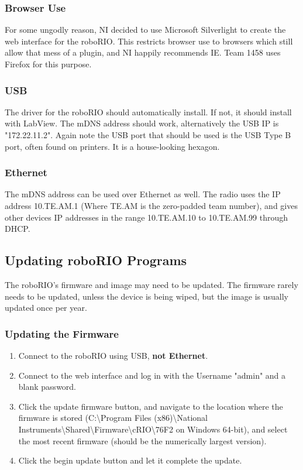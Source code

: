 \documentclass[]{report}
\begin{document}
\subsubsection{Browser Use}
For some ungodly reason, NI decided to use Microsoft Silverlight to create the web interface for the roboRIO.
This restricts browser use to browsers which still allow that mess of a plugin, and NI happily recommends IE.
Team 1458 uses Firefox for this purpose.

\subsubsection{USB}
The driver for the roboRIO should automatically install. If not, it should install with LabView.
The mDNS address should work, alternatively the USB IP is "172.22.11.2".
Again note the USB port that should be used is the USB Type B port, often found on printers.
It is a house-looking hexagon.

\subsubsection{Ethernet}
The mDNS address can be used over Ethernet as well.
The radio uses the IP address 10.TE.AM.1 (Where TE.AM is the zero-padded team number), and gives other devices IP addresses in the range 10.TE.AM.10 to 10.TE.AM.99 through DHCP.

\subsection{Updating roboRIO Programs}
The roboRIO's firmware and image may need to be updated.
The firmware rarely needs to be updated, unless the device is being wiped, but the image is usually updated once per year.

\subsubsection{Updating the Firmware}
\begin{enumerate}
\item Connect to the roboRIO using USB, \textbf{not Ethernet}.
\item Connect to the web interface and log in with the Username "admin" and a blank password.
\item Click the update firmware button, and navigate to the location where the firmware is stored
(C:\textbackslash Program Files (x86)\textbackslash National Instruments\textbackslash Shared\textbackslash Firmware\textbackslash cRIO\textbackslash 76F2 on Windows 64-bit),
and select the most recent firmware (should be the numerically largest version).
\item Click the begin update button and let it complete the update.
\end{enumerate}
\end{document}
